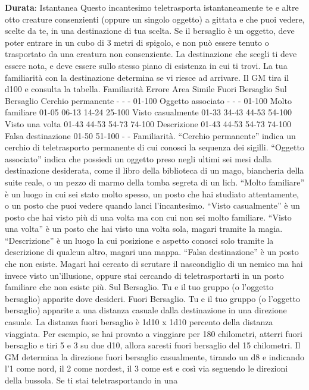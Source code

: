 \begin{multicols}{2}
\textbf{Durata}: Istantanea
Questo incantesimo teletrasporta istantaneamente te e
altre otto creature consenzienti (oppure un singolo
oggetto) a gittata e che puoi vedere, scelte da te, in una
destinazione di tua scelta. Se il bersaglio è un oggetto,
deve poter entrare in un cubo di 3 metri di spigolo, e
non può essere tenuto o trasportato da una creatura
non consenziente.
La destinazione che scegli ti deve essere nota, e deve
essere sullo stesso piano di esistenza in cui ti trovi. La
tua familiarità con la destinazione determina se vi riesce
ad arrivare. Il GM tira il d100 e consulta la tabella.
Familiarità Errore Area
Simile
Fuori
Bersaglio
Sul
Bersaglio
Cerchio
permanente
- - - 01-100
Oggetto
associato
- - - 01-100
Molto
familiare
01-05 06-13 14-24 25-100
Visto
casualmente
01-33 34-43 44-53 54-100
Visto una
volta
01-43 44-53 54-73 74-100
Descrizione 01-43 44-53 54-73 74-100
Falsa
destinazione
01-50 51-100 - -
Familiarità. “Cerchio permanente” indica un cerchio di
teletrasporto permanente di cui conosci la sequenza dei
sigilli. “Oggetto associato” indica che possiedi un
oggetto preso negli ultimi sei mesi dalla destinazione
desiderata, come il libro della biblioteca di un mago,
biancheria della suite reale, o un pezzo di marmo della
tomba segreta di un lich.
“Molto familiare” è un luogo in cui sei stato molto
spesso, un posto che hai studiato attentamente, o un
posto che puoi vedere quando lanci l’incantesimo.
“Visto casualmente” è un posto che hai visto più di una
volta ma con cui non sei molto familiare. “Visto una
volta” è un posto che hai visto una volta sola, magari
tramite la magia. “Descrizione” è un luogo la cui
posizione e aspetto conosci solo tramite la descrizione
di qualcun altro, magari una mappa.
“Falsa destinazione” è un posto che non esiste. Magari
hai cercato di scrutare il nascondiglio di un nemico ma
hai invece visto un’illusione, oppure stai cercando di
teletrasportarti in un posto familiare che non esiste più.
Sul Bersaglio. Tu e il tuo gruppo (o l’oggetto bersaglio)
apparite dove desideri.
Fuori Bersaglio. Tu e il tuo gruppo (o l’oggetto
bersaglio) apparite a una distanza casuale dalla
destinazione in una direzione casuale. La distanza fuori
bersaglio è 1d10 x 1d10 percento della distanza
viaggiata. Per esempio, se hai provato a viaggiare per
180 chilometri, atterri fuori bersaglio e tiri 5 e 3 su due
d10, allora saresti fuori bersaglio del 15%
chilometri. Il GM determina la direzione fuori bersaglio
casualmente, tirando un d8 e indicando l’1 come nord, il
2 come nordest, il 3 come est e così via seguendo le
direzioni della bussola. Se ti stai teletrasportando in una

\end{multicols}
